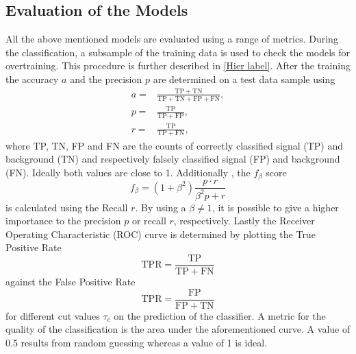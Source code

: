 \subsection{Evaluation of the Models}
All the above mentioned models are evaluated using a range of metrics. During the classification, a subsample of the training data is used to check the models for overtraining. This procedure is further described in \autoref{Hier label}.%
After the training the accuracy $a$ and the precision $p$ are determined on a test data sample using 
\begin{align*}
	a =& \frac{\mathrm{TP + TN}}{\mathrm{TP + TN + FP + FN}},\\
	p =&  \frac{\mathrm{TP}}{\mathrm{TP + FP}},\\
	r =& \frac{\mathrm{TP}}{\mathrm{TP + FN}},
\end{align*}
where TP, TN, FP and FN are the counts of correctly classified signal (TP) and background (TN) and respectively falsely classified signal (FP) and background (FN). Ideally both values are close to 1. 
Additionally , the $f_\beta$ score
\begin{equation}
	f_\beta = (1+\beta^2) \frac{p\cdot r}{\beta^2p+r}
\end{equation}
is calculated using the Recall $r$.
By using a $\beta \neq 1$, it is possible to give a higher importance to the precision $p$ or recall $r$, respectively.
Lastly the Receiver Operating Characteristic (ROC) curve is determined by plotting the True Positive Rate 
\begin{equation*}
	\mathrm{TPR} = \frac{\mathrm{TP}}{\mathrm{TP + FN}}
\end{equation*}
against the False Positive Rate 
\begin{equation*}
	\mathrm{TPR} = \frac{\mathrm{FP}}{\mathrm{FP + TN}}
\end{equation*}
for different cut values $\tau_c$ on the prediction of the classifier. A metric for the quality of the classification is the area under the aforementioned curve. A value of 0.5 results from random guessing whereas a value of 1 is ideal.









